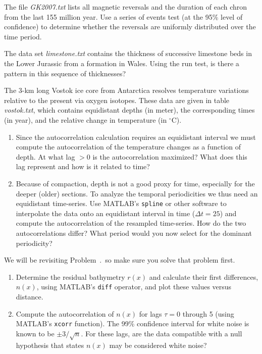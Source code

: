 \begin{problem}
The file \emph{GK2007.txt} lists all magnetic reversals and the duration of each chron from the last 155 million year.  
Use a series of events test (at the 95\% level of confidence) to determine whether the 
reversals are uniformly distributed over the time period.
\end{problem}

\begin{problem}
The data set \emph{limestone.txt} contains the thickness of successive limestone beds in the Lower Jurassic
from a formation in Wales.   Using the run test, is there a pattern in this sequence of thicknesses?
\end{problem}

\begin{problem}
\setcounter{Vostok}{\theproblem}
The 3-km long Vostok ice core from Antarctica resolves temperature variations relative to the present via
oxygen isotopes. These data are given in table \emph{vostok.txt}, which contains equidistant depths (in meter), the
corresponding times (in year), and the relative change in temperature (in $^{\circ}$C).
\begin{enumerate}[label=\alph*)]
\item Since the autocorrelation calculation requires an equidistant interval we must compute the autocorrelation
of the temperature changes as a function of depth.
At what lag $> 0$ is the autocorrelation maximized?  What does this lag represent and how is it related to
time?
\item Because of compaction, depth is not a good proxy for time, especially for the deeper (older) sections.
To analyze the temporal periodicities we thus need an equidistant time-series. Use MATLAB's \texttt{spline}
or other software to interpolate the data onto an
equidistant interval in time ($\Delta t = 25$) and compute the autocorrelation
of the resampled time-series.  How do the two autocorrelations differ? What period would you now select for the
dominant periodicity?
\end{enumerate}
\end{problem}

\begin{problem}
We will be revisiting Problem~\theConradchap.\theConrad\, so make sure you solve that problem first.
\begin{enumerate}[label=\alph*)]
\item Determine the residual bathymetry $r(x)$ and calculate their first differences, $n(x)$, using
MATLAB's \texttt{diff} operator, and plot these values versus distance.
\item Compute the autocorrelation of $n(x)$ for lags $\tau = 0$ through 5 (using MATLAB's \texttt{xcorr} function).
The 99\% confidence interval for white noise is known to be $\pm 3/\sqrt{n}$.  For these lags, are the data
compatible with a null hypothesis that states $n(x)$ may be considered white noise?
\end{enumerate}
\end{problem}

